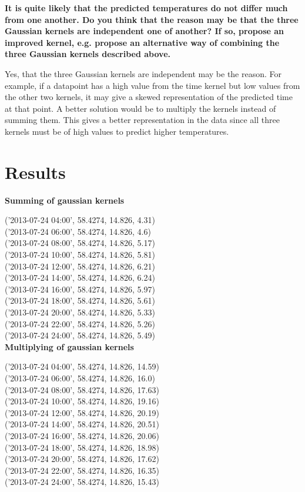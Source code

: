 \documentclass[a4paper,titlepage,12pt]{article}
\begin{document}
\textbf{It is quite likely that the predicted temperatures do not differ much from one another. Do you think that the reason may be that the three Gaussian kernels are independent one of another? If so, propose an improved kernel, e.g. propose an alternative way of combining the three Gaussian kernels described above.}

Yes, that the three Gaussian kernels are independent may be the reason. For
example, if a datapoint has a high value from the time kernel but low values
from the other two kernels, it may give a skewed representation of the predicted
time at that point. A better solution would be to multiply the kernels instead
of summing them. This gives a better representation in the data since all three
kernels must be of high values to predict higher temperatures. 

\section{Results}

\textbf{Summing of gaussian kernels}

('2013-07-24 04:00', 58.4274, 14.826, 4.31) \\
('2013-07-24 06:00', 58.4274, 14.826, 4.6) \\
('2013-07-24 08:00', 58.4274, 14.826, 5.17) \\
('2013-07-24 10:00', 58.4274, 14.826, 5.81) \\
('2013-07-24 12:00', 58.4274, 14.826, 6.21) \\
('2013-07-24 14:00', 58.4274, 14.826, 6.24) \\
('2013-07-24 16:00', 58.4274, 14.826, 5.97) \\
('2013-07-24 18:00', 58.4274, 14.826, 5.61) \\
('2013-07-24 20:00', 58.4274, 14.826, 5.33) \\
('2013-07-24 22:00', 58.4274, 14.826, 5.26) \\
('2013-07-24 24:00', 58.4274, 14.826, 5.49) \\

\textbf{Multiplying of gaussian kernels}

('2013-07-24 04:00', 58.4274, 14.826, 14.59) \\
('2013-07-24 06:00', 58.4274, 14.826, 16.0) \\
('2013-07-24 08:00', 58.4274, 14.826, 17.63) \\
('2013-07-24 10:00', 58.4274, 14.826, 19.16) \\
('2013-07-24 12:00', 58.4274, 14.826, 20.19) \\
('2013-07-24 14:00', 58.4274, 14.826, 20.51) \\
('2013-07-24 16:00', 58.4274, 14.826, 20.06) \\
('2013-07-24 18:00', 58.4274, 14.826, 18.98) \\
('2013-07-24 20:00', 58.4274, 14.826, 17.62) \\
('2013-07-24 22:00', 58.4274, 14.826, 16.35) \\
('2013-07-24 24:00', 58.4274, 14.826, 15.43) \\
\end{document}
